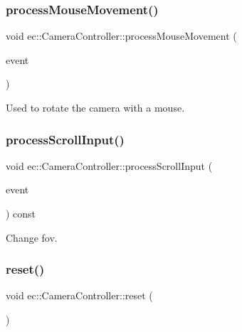 \subsubsection{\texorpdfstring{process\+Mouse\+Movement()}{processMouseMovement()}}
{\footnotesize\ttfamily void ec\+::\+Camera\+Controller\+::process\+Mouse\+Movement (\begin{DoxyParamCaption}\item[{const \mbox{\hyperlink{structec_1_1_mouse_event}{Mouse\+Event}} \&}]{event }\end{DoxyParamCaption})\hspace{0.3cm}{\ttfamily [protected]}}



Used to rotate the camera with a mouse. 

\mbox{\label{classec_1_1_camera_controller_aa2f60cde89ba3e982eef28d505927c22}} 
\subsubsection{\texorpdfstring{process\+Scroll\+Input()}{processScrollInput()}}
{\footnotesize\ttfamily void ec\+::\+Camera\+Controller\+::process\+Scroll\+Input (\begin{DoxyParamCaption}\item[{const \mbox{\hyperlink{structec_1_1_mouse_event}{Mouse\+Event}} \&}]{event }\end{DoxyParamCaption}) const\hspace{0.3cm}{\ttfamily [protected]}}



Change fov. 

\mbox{\label{classec_1_1_camera_controller_a10d1642f398f155fa06c4c74961fe91f}} 
\subsubsection{\texorpdfstring{reset()}{reset()}}
{\footnotesize\ttfamily void ec\+::\+Camera\+Controller\+::reset (\begin{DoxyParamCaption}{ }\end{DoxyParamCaption})}



